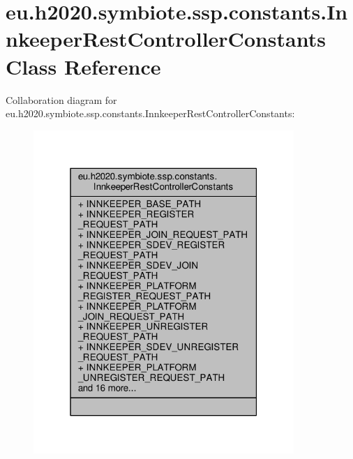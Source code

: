 \hypertarget{classeu_1_1h2020_1_1symbiote_1_1ssp_1_1constants_1_1InnkeeperRestControllerConstants}{}\section{eu.\+h2020.\+symbiote.\+ssp.\+constants.\+Innkeeper\+Rest\+Controller\+Constants Class Reference}
\label{classeu_1_1h2020_1_1symbiote_1_1ssp_1_1constants_1_1InnkeeperRestControllerConstants}


Collaboration diagram for eu.\+h2020.\+symbiote.\+ssp.\+constants.\+Innkeeper\+Rest\+Controller\+Constants\+:\nopagebreak
\begin{figure}[H]
\begin{center}
\leavevmode
\includegraphics[width=280pt]{classeu_1_1h2020_1_1symbiote_1_1ssp_1_1constants_1_1InnkeeperRestControllerConstants__coll__graph}
\end{center}
\end{figure}
